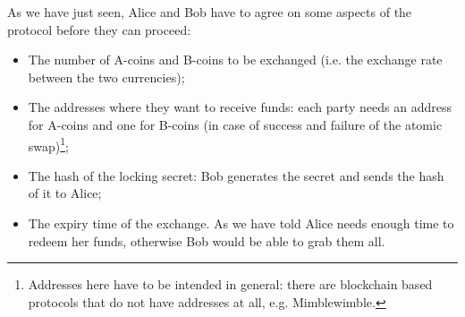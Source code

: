 \bigskip
\noindent
As we have just seen, Alice and Bob have to agree on some aspects of the protocol before they can proceed:
\begin{itemize}
	\item The number of A-coins and B-coins to be exchanged (i.e. the exchange rate between the two currencies);
	\item The addresses where they want to receive funds: each party needs an address for A-coins and one for B-coins (in case of success and failure of the atomic swap)\footnote{Addresses here have to be intended in general: there are blockchain based protocols that do not have addresses at all, e.g. Mimblewimble.};
	\item The hash of the locking secret: Bob generates the secret and sends the hash of it to Alice;
	\item The expiry time of the exchange. As we have told Alice needs enough time to redeem her funds, otherwise Bob would be able to grab them all.
\end{itemize}

